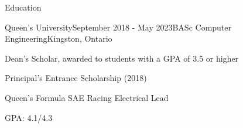 \documentclass{resume} %
\begin{document}

\begin{rSection}{Education}

\begin{rSubsection}{Queen's University}{September 2018 - May 2023}{BASc Computer Engineering}{Kingston, Ontario}
\item Dean's Scholar, awarded to students with a GPA of 3.5 or higher
\item Principal's Entrance Scholarship (2018)
\item Queen's Formula SAE Racing Electrical Lead
\item GPA: 4.1/4.3
\end{rSubsection}
\end{rSection}

\end{document}
